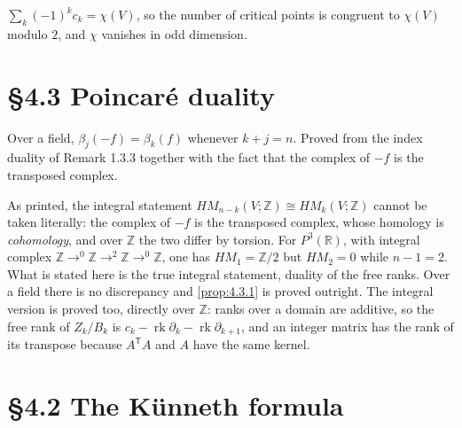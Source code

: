 \begin{corollary}
  \label{cor:4.4.1}
  \leanok
  $\sum_k (-1)^k c_k = \chi(V)$, so the number of critical points is congruent to
  $\chi(V)$ modulo $2$, and $\chi$ vanishes in odd dimension.
\end{corollary}

\section{\S4.3 Poincar\'e duality}

\begin{proposition}[Proposition 4.3.1]
  \label{prop:4.3.1}
  \leanok
  Over a field, $\beta_j(-f) = \beta_k(f)$ whenever $k + j = n$.  Proved from the
  index duality of Remark 1.3.3 together with the fact that the complex of $-f$
  is the transposed complex.
\end{proposition}

\begin{proposition}
  \label{prop:4.3.2}
  \leanok
  As printed, the integral statement $HM_{n-k}(V;\mathbb{Z}) \cong
  HM_k(V;\mathbb{Z})$ cannot be taken literally: the complex of $-f$ is the
  transposed complex, whose homology is \emph{cohomology}, and over $\mathbb{Z}$
  the two differ by torsion.  For $P^3(\mathbb{R})$, with integral complex
  $\mathbb{Z}\to^0\mathbb{Z}\to^2\mathbb{Z}\to^0\mathbb{Z}$, one has
  $HM_1 = \mathbb{Z}/2$ but $HM_2 = 0$ while $n-1 = 2$.  What is stated here is
  the true integral statement, duality of the free ranks.  Over a field there is
  no discrepancy and \ref{prop:4.3.1} is proved outright.  The integral version
  is proved too, directly over $\mathbb{Z}$: ranks over a domain are additive,
  so the free rank of $Z_k/B_k$ is $c_k - \operatorname{rk}\partial_k -
  \operatorname{rk}\partial_{k+1}$, and an integer matrix has the rank of its
  transpose because $A^{\mathsf T}A$ and $A$ have the same kernel.
\end{proposition}

\section{\S4.2 The K\"unneth formula}


